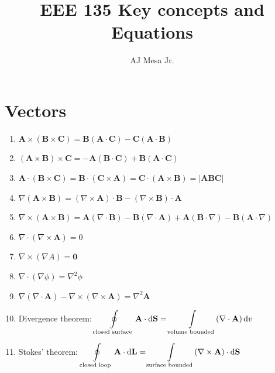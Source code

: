 \documentclass[a4paper,11pt]{article}
\title{\textbf{EEE 135 Key concepts and Equations}}
\author{AJ Mesa Jr.}
\newcommand*\dd{\mathop{}\!\mathrm{d}}
\newcommand{\grad}{\nabla}
\newcommand{\divr}{\nabla \cdot}
\newcommand{\curl}{\nabla \times}
\newcommand{\bvec}[1]{\mathbf{#1}}
\begin{document}
	\maketitle	
	\section*{Vectors}
		\begin{enumerate}
			\item $\bvec{A} \times (\bvec{B} \times \bvec{C}) = \bvec{B}(\bvec{A} \cdot \bvec{C}) - \bvec{C}(\bvec{A} \cdot \bvec{B} )$
			\item $(\bvec{A} \times \bvec{B}) \times \bvec{C} = -\bvec{A}(\bvec{B} \cdot \bvec{C}) + \bvec{B}(\bvec{A} \cdot \bvec{C} )$
			\item $\bvec{A} \cdot (\bvec{B} \times \bvec{C}) = \bvec{B} \cdot (\bvec{C} \times \bvec{A}) = \bvec{C} \cdot (\bvec{A} \times \bvec{B}) = \left| \bvec{A}\bvec{B}\bvec{C} \right|$
			\item $\grad(\bvec{A} \times \bvec{B}) = (\grad \times \bvec{A})\cdot\bvec{B} - (\grad \times \bvec{B})\cdot\bvec{A}$
			\item $\grad\times (\bvec{A} \times \bvec{B}) = \bvec{A}(\divr\bvec{B}) - \bvec{B}(\divr\bvec{A}) + \bvec{A}(\bvec{B}\cdot\grad) - \bvec{B}(\bvec{A}\cdot\grad)$
			\item $\divr(\curl\bvec{A}) = 0$ 
			\item $\curl(\grad A) = \bvec{0}$
			\item $\divr(\grad\phi) = \grad^2\phi$
			\item $\grad(\divr\bvec{A}) - \curl(\curl\bvec{A}) = \grad^2 \bvec{A}$
			\item Divergence theorem: $\displaystyle \oint\displaylimits_\text{closed surface} \bvec{A} \cdot \dd \bvec{S} = \int\displaylimits_\text{volume bounded} (\divr\bvec{A}) \dd v$
			\item Stokes' theorem: $\displaystyle \oint\displaylimits_\text{closed loop} \bvec{A} \cdot \dd \bvec{L} = \int\displaylimits_\text{surface bounded} (\curl\bvec{A}) \cdot \dd \bvec{S} $
		\end{enumerate}
	\newpage
\end{document}
